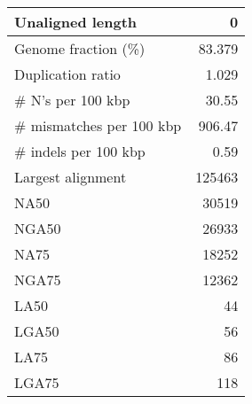 \documentclass[12pt,a4paper]{article}
\begin{document}
\begin{table}[ht]
\begin{center}
\begin{tabular}{|l*{1}{|r}|}
Unaligned length & 0 \\ \hline
Genome fraction (\%) & 83.379 \\ \hline
Duplication ratio & 1.029 \\ \hline
\# N's per 100 kbp & 30.55 \\ \hline
\# mismatches per 100 kbp & 906.47 \\ \hline
\# indels per 100 kbp & 0.59 \\ \hline
Largest alignment & 125463 \\ \hline
NA50 & 30519 \\ \hline
NGA50 & 26933 \\ \hline
NA75 & 18252 \\ \hline
NGA75 & 12362 \\ \hline
LA50 & 44 \\ \hline
LGA50 & 56 \\ \hline
LA75 & 86 \\ \hline
LGA75 & 118 \\ \hline
\end{tabular}
\end{center}
\end{table}
\end{document}
